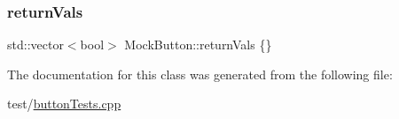\mbox{\label{classMockButton_a0c5466c19c4adec313c92a9ada02d3f2}} 
\subsubsection{\texorpdfstring{returnVals}{returnVals}}
{\footnotesize\ttfamily std\+::vector$<$bool$>$ Mock\+Button\+::return\+Vals \{\}}



The documentation for this class was generated from the following file\+:\begin{DoxyCompactItemize}
\item 
test/\mbox{\hyperlink{buttonTests_8cpp}{button\+Tests.\+cpp}}\end{DoxyCompactItemize}
